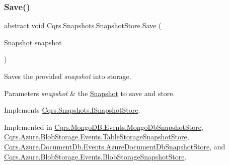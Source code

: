 \mbox{\label{classCqrs_1_1Snapshots_1_1SnapshotStore_ae96ea2bb89a0bd7f45544acc37107525_ae96ea2bb89a0bd7f45544acc37107525}} 
\subsubsection{\texorpdfstring{Save()}{Save()}}
{\footnotesize\ttfamily abstract void Cqrs.\+Snapshots.\+Snapshot\+Store.\+Save (\begin{DoxyParamCaption}\item[{\hyperlink{classCqrs_1_1Snapshots_1_1Snapshot}{Snapshot}}]{snapshot }\end{DoxyParamCaption})\hspace{0.3cm}{\ttfamily [pure virtual]}}



Saves the provided {\itshape snapshot}  into storage. 


\begin{DoxyParams}{Parameters}
{\em snapshot} & the \hyperlink{classCqrs_1_1Snapshots_1_1Snapshot}{Snapshot} to save and store.\\
\hline
\end{DoxyParams}


Implements \hyperlink{interfaceCqrs_1_1Snapshots_1_1ISnapshotStore_a6e99c620115ce8a0648a83bf2ce05527_a6e99c620115ce8a0648a83bf2ce05527}{Cqrs.\+Snapshots.\+I\+Snapshot\+Store}.



Implemented in \hyperlink{classCqrs_1_1MongoDB_1_1Events_1_1MongoDbSnapshotStore_abd129099f8ed40c140ad2b39e730035a_abd129099f8ed40c140ad2b39e730035a}{Cqrs.\+Mongo\+D\+B.\+Events.\+Mongo\+Db\+Snapshot\+Store}, \hyperlink{classCqrs_1_1Azure_1_1BlobStorage_1_1Events_1_1TableStorageSnapshotStore_a25ec7d179773aec79febdf0e8873b285_a25ec7d179773aec79febdf0e8873b285}{Cqrs.\+Azure.\+Blob\+Storage.\+Events.\+Table\+Storage\+Snapshot\+Store}, \hyperlink{classCqrs_1_1Azure_1_1DocumentDb_1_1Events_1_1AzureDocumentDbSnapshotStore_a52dd38e57e884db7529c8f57c3da7479_a52dd38e57e884db7529c8f57c3da7479}{Cqrs.\+Azure.\+Document\+Db.\+Events.\+Azure\+Document\+Db\+Snapshot\+Store}, and \hyperlink{classCqrs_1_1Azure_1_1BlobStorage_1_1Events_1_1BlobStorageSnapshotStore_afb32196428d4c92c9542a94a1764fa59_afb32196428d4c92c9542a94a1764fa59}{Cqrs.\+Azure.\+Blob\+Storage.\+Events.\+Blob\+Storage\+Snapshot\+Store}.



